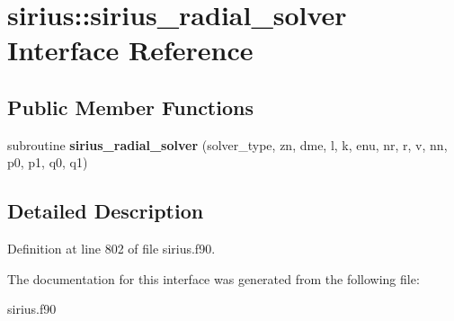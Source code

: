 \hypertarget{interfacesirius_1_1sirius__radial__solver}{}\section{sirius\+:\+:sirius\+\_\+radial\+\_\+solver Interface Reference}
\label{interfacesirius_1_1sirius__radial__solver}
\subsection*{Public Member Functions}
\begin{DoxyCompactItemize}
\item 
\hypertarget{interfacesirius_1_1sirius__radial__solver_a52760f145d8c78161d10063ff4b8abf2}{}subroutine {\bfseries sirius\+\_\+radial\+\_\+solver} (solver\+\_\+type, zn, dme, l, k, enu, nr, r, v, nn, p0, p1, q0, q1)\label{interfacesirius_1_1sirius__radial__solver_a52760f145d8c78161d10063ff4b8abf2}

\end{DoxyCompactItemize}


\subsection{Detailed Description}


Definition at line 802 of file sirius.\+f90.



The documentation for this interface was generated from the following file\+:\begin{DoxyCompactItemize}
\item 
sirius.\+f90\end{DoxyCompactItemize}
